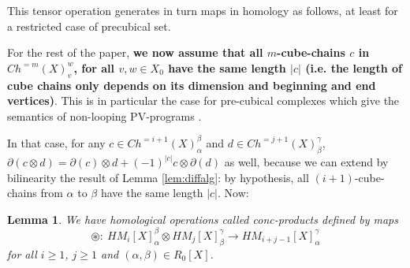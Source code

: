 \documentclass{article}
\newtheorem{lemma}[definition]{Lemma} %
\begin{document}
This tensor operation generates in turn maps in homology as follows, at least for a restricted case of precubical set. 

For the rest of the paper, {\bf we now assume that all $m$-cube-chains $c$ in $Ch^{=m}(X)_v^w$, for all $v, w \in X_0$ have the same length $|c|$ (i.e. the length of cube chains only depends on its dimension and beginning and end vertices)}. This is in particular the case for pre-cubical complexes which give the semantics of non-looping PV-programs \cite{thebook}. 

In that case, for any $c\in Ch^{=i+1}(X)_{\alpha}^{\beta}$ and $d\in Ch^{=j+1}(X)_{\beta}^{\gamma}$, $\partial(c\otimes d) = \partial(c)\otimes d +(-1)^{|c|} c\otimes \partial(d)$ as well, because we can extend by bilinearity the result of Lemma \ref{lem:diffalg}: by hypothesis, all $(i+1)$-cube-chains from $\alpha$ to $\beta$ have the same length $|c|$. Now: 


\begin{lemma}
\label{lem:conc}
We have homological operations called conc-products defined by maps 
$$\circledast: \ HM_i[X]_\alpha^\beta \otimes HM_j[X]_\beta^\gamma \rightarrow HM_{i+j-1}[X]_\alpha^\gamma$$ 
\noindent for all $i\geq 1$, $j\geq 1$ and $(\alpha,\beta) \in R_0[X]$. 
\end{lemma}
\end{document}
